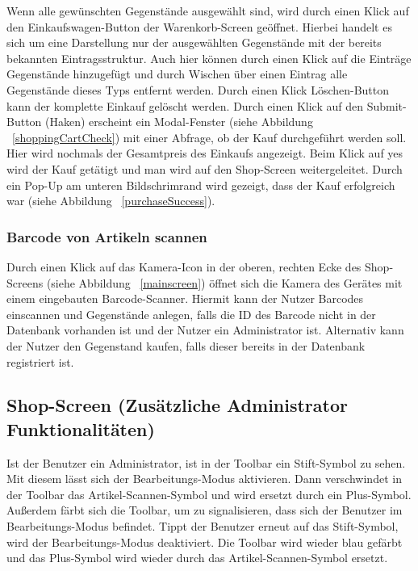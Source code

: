 Wenn alle gewünschten Gegenstände ausgewählt sind, wird durch einen Klick auf den Einkaufswagen-Button der Warenkorb-Screen geöffnet.
Hierbei handelt es sich um eine Darstellung nur der ausgewählten Gegenstände mit der bereits bekannten Eintragsstruktur.
Auch hier können durch einen Klick auf die Einträge Gegenstände hinzugefügt und durch Wischen über einen Eintrag alle Gegenstände dieses Typs entfernt werden.
Durch einen Klick Löschen-Button kann der komplette Einkauf gelöscht werden.
Durch einen Klick auf den Submit-Button (Haken) erscheint ein Modal-Fenster (siehe Abbildung ~\ref{shoppingCartCheck}) mit einer Abfrage, ob der Kauf durchgeführt werden soll.
Hier wird nochmals der Gesamtpreis des Einkaufs angezeigt.
Beim Klick auf \glqq yes\grqq{} wird der Kauf getätigt und man wird auf den Shop-Screen weitergeleitet.
Durch ein Pop-Up am unteren Bildschrimrand wird gezeigt, dass der Kauf erfolgreich war (siehe Abbildung ~\ref{purchaseSuccess}).



\subsubsection{Barcode von Artikeln scannen} \label{subsubsec:shop-scan-item}

Durch einen Klick auf das Kamera-Icon in der oberen, rechten Ecke des Shop-Screens (siehe Abbildung ~\ref{mainscreen}) öffnet sich die Kamera des Gerätes mit einem eingebauten Barcode-Scanner.
Hiermit kann der Nutzer Barcodes einscannen und Gegenstände anlegen, falls die ID des Barcode nicht in der Datenbank vorhanden ist und der Nutzer ein Administrator ist.
Alternativ kann der Nutzer den Gegenstand kaufen, falls dieser bereits in der Datenbank registriert ist.

\subsection{Shop-Screen (Zusätzliche Administrator Funktionalitäten)} \label{subsec:shop-screen-admin}

Ist der Benutzer ein Administrator, ist in der Toolbar ein Stift-Symbol zu sehen.
Mit diesem lässt sich der Bearbeitungs-Modus aktivieren.
Dann verschwindet in der Toolbar das Artikel-Scannen-Symbol und wird ersetzt durch ein Plus-Symbol.
Außerdem färbt sich die Toolbar, um zu signalisieren, dass sich der Benutzer im Bearbeitungs-Modus befindet.
Tippt der Benutzer erneut auf das Stift-Symbol, wird der Bearbeitungs-Modus deaktiviert.
Die Toolbar wird wieder blau gefärbt und das Plus-Symbol wird wieder durch das Artikel-Scannen-Symbol ersetzt.

